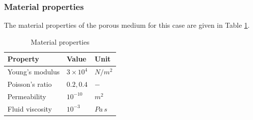 \subsubsection*{Material properties}
 The material properties of the porous medium for this case are given in Table
\ref{tab:materials_case1}.
\begin{table}[!htb]
\centering
\caption{Material properties}
\label{tab:materials_case1}
%
%
\begin{tabular}{lll}
\hline\hline
Property & Value & Unit \\
\hline
Young's modulus & $3\times 10^{4}$  & $N/m^{2}$ \\
Poisson's ratio & $0.2, 0.4$       & $-$ \\
Permeability    & $10^{-10}$        & $m^2$ \\
Fluid viscosity & $10^{-3}$         & $Pa\,s$ \\
\hline \hline
\end{tabular}
\end{table}
